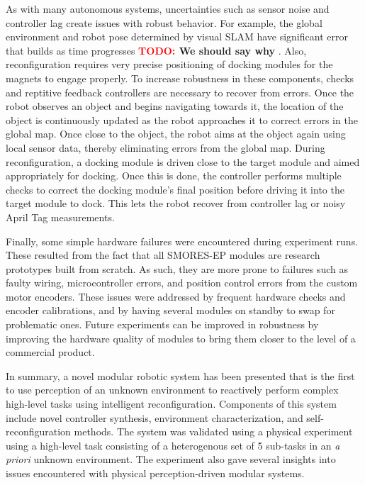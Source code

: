 \documentclass[conference]{IEEEtran}
\newcommand{\TODO}[1]{ {\bf \textcolor{red}{TODO:} #1 }}
\begin{document}
As with many autonomous systems, uncertainties such as sensor noise and controller lag create issues with robust behavior. For example, the global environment and robot pose determined by visual SLAM have significant error that builds as time progresses \TODO{We should say why}. Also, reconfiguration requires very precise positioning of docking modules for the magnets to engage properly. To increase robustness in these components, checks and reptitive feedback controllers are necessary to recover from errors. Once the robot observes an object and begins navigating towards it, the location of the object is continuously updated as the robot approaches it to correct errors in the global map. Once close to the object, the robot aims at the object again using local sensor data, thereby eliminating errors from the global map. During reconfiguration, a docking module is driven close to the target module and aimed appropriately for docking. Once this is done, the controller performs multiple checks to correct the docking module's final position before driving it into the target module to dock. This lets the robot recover from controller lag or noisy April Tag measurements.

Finally, some simple hardware failures were encountered during experiment runs. These resulted from the fact that all SMORES-EP modules are research prototypes built from scratch. As such, they are more prone to failures such as faulty wiring, microcontroller errors, and position control errors from the custom motor encoders. These issues were addressed by frequent hardware checks and encoder calibrations, and by having several modules on standby to swap for problematic ones. Future experiments can be improved in robustness by improving the hardware quality of modules to bring them closer to the level of a commercial product.

In summary, a novel modular robotic system has been presented that is the first to use perception of an unknown environment to reactively perform complex high-level tasks using intelligent reconfiguration. Components of this system include novel controller synthesis, environment characterization, and self-reconfiguration methods. The system was validated using a physical experiment using a high-level task consisting of a heterogenous set of 5 sub-tasks in an \textit{a priori} unknown environment. The experiment also gave several insights into issues encountered with physical perception-driven modular systems.

\end{document}
